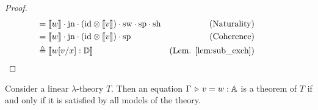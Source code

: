 \begin{proof}
\begin{align*}
  &  \hspace{-30pt} = \llbracket w \rrbracket \comp \text{jn} \comp ( \id \otimes \llbracket v \rrbracket )  \comp  \sw  \comp  \text{sp} \comp \text{sh} & {\text{(Naturality)}}\\
  &   \hspace{-30pt} = \llbracket w \rrbracket \comp \text{jn} \comp ( \id \otimes \llbracket v \rrbracket )  \comp  \text{sp} & {\text{(Coherence)}}\\
  &  \hspace{-30pt} \triangleq \llbracket w[v/x] : \typeD \rrbracket & (\text{Lem. \ref{lem:sub_exch}})
\end{align*}



\end{proof}



\begin{theorem}[Completeness] \label{thm:completeness_classical}
Consider a linear $\lambda$-theory $T$. Then an equation 
$\Gamma \, \triangleright \, v = w : \mathbb{A}$
is a theorem of $T$ if and only if it is satisfied by all models of the theory.
\end{theorem}


